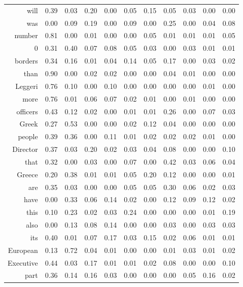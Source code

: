 \begin{longtable}{rrrrrrrrrrr}
  will & 0.39 & 0.03 & 0.20 & 0.00 & 0.05 & 0.15 & 0.05 & 0.03 & 0.00 & 0.00 \\ 
  was & 0.00 & 0.09 & 0.19 & 0.00 & 0.09 & 0.00 & 0.25 & 0.00 & 0.04 & 0.08 \\ 
  number & 0.81 & 0.00 & 0.01 & 0.00 & 0.00 & 0.05 & 0.01 & 0.01 & 0.01 & 0.05 \\ 
  0 & 0.31 & 0.40 & 0.07 & 0.08 & 0.05 & 0.03 & 0.00 & 0.03 & 0.01 & 0.01 \\ 
  borders & 0.34 & 0.16 & 0.01 & 0.04 & 0.14 & 0.05 & 0.17 & 0.00 & 0.03 & 0.02 \\ 
  than & 0.90 & 0.00 & 0.02 & 0.02 & 0.00 & 0.00 & 0.04 & 0.01 & 0.00 & 0.00 \\ 
  Leggeri & 0.76 & 0.10 & 0.00 & 0.10 & 0.00 & 0.00 & 0.00 & 0.00 & 0.01 & 0.00 \\ 
  more & 0.76 & 0.01 & 0.06 & 0.07 & 0.02 & 0.01 & 0.00 & 0.01 & 0.00 & 0.00 \\ 
  officers & 0.43 & 0.12 & 0.02 & 0.00 & 0.01 & 0.01 & 0.26 & 0.00 & 0.07 & 0.03 \\ 
  Greek & 0.27 & 0.53 & 0.00 & 0.00 & 0.02 & 0.12 & 0.04 & 0.00 & 0.00 & 0.00 \\ 
  people & 0.39 & 0.36 & 0.00 & 0.11 & 0.01 & 0.02 & 0.02 & 0.02 & 0.01 & 0.00 \\ 
  Director & 0.37 & 0.03 & 0.20 & 0.02 & 0.03 & 0.04 & 0.08 & 0.00 & 0.00 & 0.10 \\ 
  that & 0.32 & 0.00 & 0.03 & 0.00 & 0.07 & 0.00 & 0.42 & 0.03 & 0.06 & 0.04 \\ 
  Greece & 0.20 & 0.38 & 0.01 & 0.01 & 0.05 & 0.20 & 0.12 & 0.00 & 0.00 & 0.01 \\ 
  are & 0.35 & 0.03 & 0.00 & 0.00 & 0.05 & 0.05 & 0.30 & 0.06 & 0.02 & 0.03 \\ 
  have & 0.00 & 0.33 & 0.06 & 0.14 & 0.02 & 0.00 & 0.12 & 0.09 & 0.12 & 0.02 \\ 
  this & 0.10 & 0.23 & 0.02 & 0.03 & 0.24 & 0.00 & 0.00 & 0.00 & 0.01 & 0.19 \\ 
  also & 0.00 & 0.13 & 0.08 & 0.14 & 0.00 & 0.00 & 0.03 & 0.00 & 0.03 & 0.03 \\ 
  its & 0.40 & 0.01 & 0.07 & 0.17 & 0.03 & 0.15 & 0.02 & 0.06 & 0.01 & 0.01 \\ 
  European & 0.13 & 0.72 & 0.04 & 0.01 & 0.00 & 0.00 & 0.01 & 0.03 & 0.01 & 0.02 \\ 
  Executive & 0.44 & 0.03 & 0.17 & 0.01 & 0.01 & 0.02 & 0.08 & 0.00 & 0.00 & 0.10 \\ 
  part & 0.36 & 0.14 & 0.16 & 0.03 & 0.00 & 0.00 & 0.00 & 0.05 & 0.16 & 0.02 \\ 

\end{longtable}
